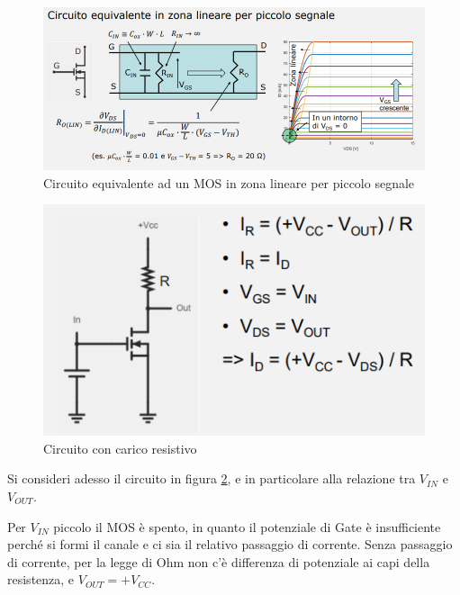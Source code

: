 \documentclass{article}
\begin{document}
\begin{figure}[h!]
  \centering
  \includegraphics[scale=0.55]{IM_MOS_equivalente_lineare_bis}
  \caption{Circuito equivalente ad un MOS in zona lineare per piccolo segnale}
  \label{Schema_MOS_equivalente_lineare_bis}
\end{figure}
\clearpage
\begin{figure}[h]
  \centering
  \includegraphics[scale=0.6]{IM_inverter}
  \caption{Circuito con carico resistivo}
  \label{Schema_inverter}
\end{figure}

Si consideri adesso il circuito in figura \ref{Schema_inverter}, e in particolare alla relazione tra $V_{IN}$ e $V_{OUT}$. 

\vspace{1mm}

Per $V_{IN}$ piccolo il MOS è spento, in quanto il potenziale di Gate è insufficiente perché si formi il canale e ci sia il relativo passaggio di corrente. Senza passaggio di corrente, per la legge di Ohm non c'è differenza di potenziale ai capi della resistenza, e $V_{OUT} = + V_{CC}$. 

\vspace{1mm}
\end{document}
